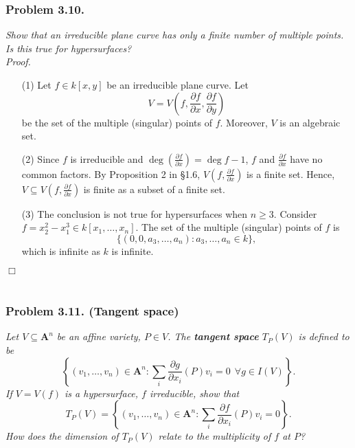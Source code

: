 \documentclass{article}
\begin{document}
\subsubsection*{Problem 3.10.}
\emph{Show that an irreducible plane curve has only a finite number of multiple points.
Is this true for hypersurfaces?} \\



\emph{Proof.}
\begin{enumerate}
\item[(1)]
  Let $f \in k[x,y]$ be an irreducible plane curve.
  Let
  \[
    V
    = V\left( f, \frac{\partial f}{\partial x}, \frac{\partial f}{\partial y} \right)
  \]
  be the set of the multiple (singular) points of $f$.
  Moreover, $V$ is an algebraic set.

\item[(2)]
  Since $f$ is irreducible and $\deg\left( \frac{\partial f}{\partial x} \right) = \deg f - 1$,
  $f$ and $\frac{\partial f}{\partial x}$ have no common factors.
  By Proposition 2 in \S 1.6,
  $V\left( f, \frac{\partial f}{\partial x} \right)$ is a finite set.
  Hence,
  $V \subseteq V\left( f, \frac{\partial f}{\partial x} \right)$ is finite
  as a subset of a finite set.

\item[(3)]
  The conclusion is not true for hypersurfaces when $n \geq 3$.
  Consider $f = x_2^2 - x_1^3 \in k[x_1,\ldots,x_n]$.
  The set of the multiple (singular) points of $f$ is
  \[
    \{ (0,0,a_3,\ldots,a_n) : a_3,\ldots,a_n \in k \},
  \]
  which is infinite as $k$ is infinite.
\end{enumerate}
$\Box$ \\\\






\subsubsection*{Problem 3.11. (Tangent space)}
\emph{Let $V \subseteq \mathbf{A}^{n}$ be an affine variety, $P \in V$.
The \textbf{tangent space} $T_P(V)$ is defined to be
\[
  \left\{
    (v_1, \ldots, v_n) \in \mathbf{A}^{n} :
    \sum_i \frac{\partial g}{\partial x_i}(P) v_i = 0 \:\: \forall g \in I(V)
  \right\}.
\]
If $V = V(f)$ is a hypersurface, $f$ irreducible, show that
\[
  T_P(V)
  =
  \left\{
    (v_1, \ldots, v_n) \in \mathbf{A}^{n} :
    \sum_i \frac{\partial f}{\partial x_i}(P) v_i = 0
  \right\}.
\]
How does the dimension of $T_P(V)$ relate to the multiplicity of $f$ at $P$?} \\
\end{document}
